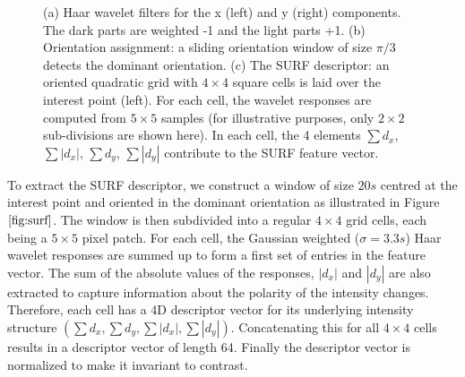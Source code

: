 \documentclass{SMBV12}
\begin{document}
\begin{figure}[htbp]
    \centering
    \caption{(a) Haar wavelet filters for the x (left) and y (right) components. The dark parts are weighted -1 and the light parts +1. (b) Orientation assignment: a sliding orientation window of size $\pi/3$ detects the dominant orientation. (c) The SURF descriptor: an oriented quadratic grid with $4 \times 4$ square cells is laid over the interest point (left). For each cell, the wavelet responses are computed from $5 \times 5$ samples (for illustrative
    purposes, only $2 \times 2$ sub-divisions are shown here). In each cell, the 4 elements $\sum d_x$, $\sum \left| d_x \right|$, $\sum d_y$, $\sum \left| d_y \right| $ contribute to the SURF feature vector. } 
\end{figure}

To extract the SURF descriptor, we construct a window of size $20s$ centred at the interest point and oriented in the dominant orientation as illustrated in Figure $\ref{fig:surf}$. The window is then subdivided into a regular $4 \times 4$ grid cells, each being a $5 \times 5$ pixel patch. For each cell, the Gaussian weighted ($\sigma = 3.3s$) Haar wavelet responses are summed up to form a first set of entries in the feature vector. The sum of the absolute values of the responses, $\left| d_x \right| $ and $\left| d_y \right| $ are also extracted to capture information about the polarity of the intensity changes. Therefore, each cell has a 4D descriptor vector for its underlying intensity structure $\left( \sum d_x, \sum d_y, \sum \left| d_x \right| , \sum \left| d_y \right|  \right)$. Concatenating this for all $4 \times 4$ cells results in a descriptor vector of length 64. Finally the descriptor vector is normalized to make it invariant to contrast.
\end{document}
